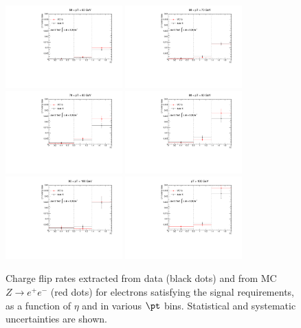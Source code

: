 \begin{figure}[h!]
\includegraphics[width=0.4\textwidth]{FIGURES/BKG/chargeFlip/CFrates___dataVSmc___PTbin4.pdf}
\includegraphics[width=0.4\textwidth]{FIGURES/BKG/chargeFlip/CFrates___dataVSmc___PTbin5.pdf}
\vfill
\includegraphics[width=0.4\textwidth]{FIGURES/BKG/chargeFlip/CFrates___dataVSmc___PTbin6.pdf}
\includegraphics[width=0.4\textwidth]{FIGURES/BKG/chargeFlip/CFrates___dataVSmc___PTbin7.pdf}
\vfill
\includegraphics[width=0.4\textwidth]{FIGURES/BKG/chargeFlip/CFrates___dataVSmc___PTbin8.pdf}
\includegraphics[width=0.4\textwidth]{FIGURES/BKG/chargeFlip/CFrates___dataVSmc___PTbin9.pdf}
\caption{\label{fig:CFratesNominal_1} Charge flip rates extracted from data (black dots) and from MC $Z\to e^+e^-$ (red dots) for electrons satisfying the signal requirements, as a function of $\eta$ and in various $\pt$ bins. Statistical and systematic uncertainties are shown.}
\end{figure}
